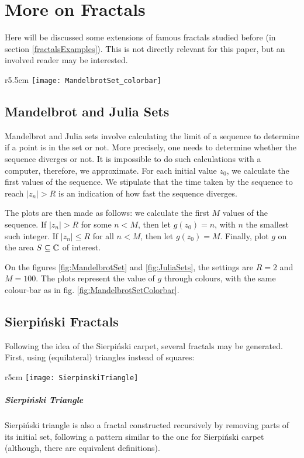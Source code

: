 \section{More on Fractals}
Here will be discussed some extensions of famous fractals studied before (in section \ref{fractalsExamples}).
This is not directly relevant for this paper, but an involved reader may be interested.

\begin{wrapfigure}{r}{5.5cm}
	\vspace{-1.5cm}
	\texttt{[image: MandelbrotSet\_colorbar]}
	\centering
	\captionsetup{justification=centering}
	\caption{Mandelbrot Set}
	\label{fig:MandelbrotSetColorbar}
\end{wrapfigure}
\subsection{Mandelbrot and Julia Sets}
Mandelbrot and Julia sets involve calculating the limit of a sequence to determine if a point is in the set or not.
More precisely, one needs to determine whether the sequence diverges or not.
It is impossible to do such calculations with a computer, therefore, we approximate.
For each initial value $z_0$, we calculate the first values of the sequence.
We stipulate that the time taken by the sequence to reach $|z_n|>R$ is an indication of how fast the sequence diverges.

The plots are then made as follows:
we calculate the first $M$ values of the sequence.
If $|z_n|>R$ for some $n<M$, then let $g(z_0) = n$, with $n$ the smallest such integer.
If $|z_n| \leq R$ for all $n<M$, then let $g(z_0) = M$.
Finally, plot $g$ on the area $S \subseteq \mathbb{C}$ of interest.

On the figures \ref{fig:MandelbrotSet} and \ref{fig:JuliaSets}, the settings are $R=2$ and $M=100$.
The plots represent the value of $g$ through colours, with the same colour-bar as in fig. \ref{fig:MandelbrotSetColorbar}.


\subsection{Sierpiński Fractals}
Following the idea of the Sierpiński carpet, several fractals may be generated.
First, using (equilateral) triangles instead of squares:

\begin{wrapfigure}{r}{5cm}
	\vspace{-0.5cm}
	\texttt{[image: SierpinskiTriangle]}
	\centering
	\captionsetup{justification=centering}
	\caption{Sierpinski Triangle (8 steps)}
	\label{fig:SierpinskiTriangle}
	\vspace{-3cm}
\end{wrapfigure}
\subparagraph{Sierpiński Triangle}
Sierpiński triangle is also a fractal constructed recursively by removing parts of its initial set, following a pattern similar to the one for Sierpiński carpet (although, there are equivalent definitions).

